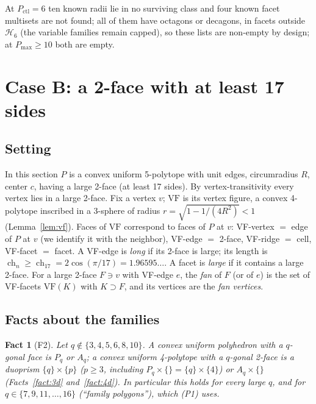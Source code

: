 \documentclass[11pt]{article}
\newtheorem{fact}[theorem]{Fact}
\theoremstyle{definition}
\theoremstyle{remark}
\newcommand{\VF}{\mathrm{VF}}
\newcommand{\ch}{\operatorname{ch}}
\begin{document}
At $P_{\mathrm{ctl}}=6$ ten known radii lie in no surviving class and four known
facet multisets are not found; all of them have octagons or decagons,
in facets outside $\mathcal H_6$ (the variable families remain capped),
so these lists are non-empty by design; at
$P_{\max}\ge10$ both are empty.

\section{Case B: a 2-face with at least 17 sides}\label{sec:caseB}

\subsection{Setting}

In this section $P$ is a convex uniform 5-polytope with unit edges,
circumradius $R$, center $c$, having a large 2-face (at least 17 sides).
By vertex-transitivity every vertex lies in a large 2-face. Fix a vertex
$v$; $\VF$ is its vertex figure, a convex 4-polytope inscribed in a
3-sphere of radius $r=\sqrt{1-1/(4R^2)}<1$ (Lemma~\ref{lem:vf}). Faces of
$\VF$ correspond to faces of $P$ at $v$: VF-vertex $=$ edge of $P$ at $v$
(we identify it with the neighbor), VF-edge $=$ 2-face, VF-ridge $=$
cell, VF-facet $=$ facet. A VF-edge is \emph{long} if its 2-face is large;
its length is $\ch_n\ge\ch_{17}=2\cos(\pi/17)=1.96595\ldots$. A facet is
\emph{large} if it contains a large 2-face. For a large 2-face $F\ni v$
with VF-edge $e$, the \emph{fan} of $F$ (or of $e$) is the set of
VF-facets $\VF(K)$ with $K\supset F$, and its vertices are the \emph{fan
vertices}.

\subsection{Facts about the families}

\setcounter{theorem}{0}
\begin{fact}[F2]\label{fact:F2}
Let $q\notin\{3,4,5,6,8,10\}$. A convex uniform polyhedron with a $q$-gonal
face is $P_q$ or $A_q$; a convex uniform 4-polytope with a $q$-gonal 2-face
is a duoprism $\{q\}\times\{p\}$ ($p\ge3$, including $P_q\times\{\}=\{q\}\times\{4\}$)
or $A_q\times\{\}$ (Facts~\ref{fact:3d} and~\ref{fact:4d}). In particular
this holds for every large $q$, and for $q\in\{7,9,11,\dots,16\}$
(``family polygons''), which (P1) uses.
\end{fact}
\end{document}
